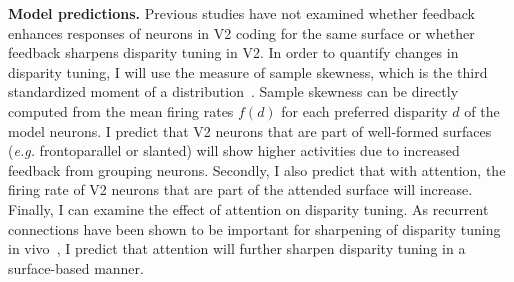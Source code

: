 \documentclass[11pt]{article}
\newcommand{\eg}[0]{{\em e.g.}\xspace}
\begin{document}
\textbf{Model predictions.} Previous studies have not examined whether feedback enhances responses of neurons in V2 coding for the same surface or whether feedback sharpens disparity
tuning in V2.
In order to quantify changes in disparity tuning, I
will use the measure of sample skewness, which is the third
standardized moment of a distribution~\citep{Samonds_etal13}. Sample
skewness can be directly computed from the mean firing rates $f(d) $
for each preferred disparity $d$ of the model neurons. I predict that
V2 neurons that
are part of well-formed surfaces (\eg frontoparallel or slanted) will show higher activities due to
increased feedback from grouping neurons. Secondly, I also predict
that with attention, the firing rate of V2 neurons that are part of
the attended surface will increase. Finally, I can examine the effect
of attention on disparity tuning. As recurrent connections have been
shown to be important for sharpening of disparity tuning in
vivo~\citep{Samonds_etal13}, I predict that attention will further
sharpen disparity tuning in a surface-based manner. 
\end{document}
